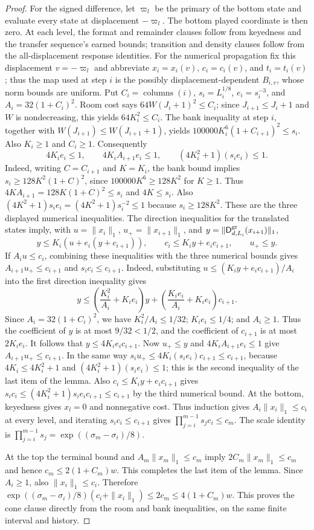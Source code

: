 \begin{proof}
For the signed difference, let $\varpi_l$ be the primary of the bottom state
and evaluate every state at displacement $-\varpi_l$. The bottom played
coordinate is then zero. At each level, the format and remainder clauses
follow from keyedness and the transfer sequence's earned bounds; transition and density
clauses follow from the all-displacement response identities. For the
numerical propagation fix this displacement $v=-\varpi_l$ and abbreviate
$x_i=x_i(v)$, $c_i=c_i(v)$, and $t_i=t_i(v)$; thus the map used at step $i$
is the possibly displacement-dependent $B_{i,v}$, whose norm bounds are
uniform. Put $C_i=\operatorname{columns}(i)$,
$s_i=L_i^{1/8}$, $e_i=s_i^{-3}$, and $A_i=32(1+C_i)^2$. Room cost says
$64W(J_i+1)^2\leq C_i$; since $J_{i+1}\leq J_i+1$ and $W$ is
nondecreasing, this yields $64K_i^2\leq C_i$. The bank inequality at
step $i$, together with $W(J_{i+1})\leq W(J_{i+1}+1)$, yields
$100000K_i^6(1+C_{i+1})^2\leq s_i$. Also $K_i\geq1$ and
$C_i\geq1$. Consequently
\[
 4K_ie_i\leq1,\qquad 4K_iA_{i+1}e_i\leq1,
       \qquad (4K_i^2+1)(s_ie_i)\leq1.
\]
Indeed, writing $C=C_{i+1}$ and $K=K_i$, the bank bound implies
$s_i\geq128K^2(1+C)^2$, since $100000K^6\geq128K^2$ for $K\geq1$.
Thus $4KA_{i+1}=128K(1+C)^2\leq s_i$ and $4K\leq s_i$.
Also $(4K^2+1)s_ie_i=(4K^2+1)s_i^{-2}\leq1$ because
$s_i\geq128K^2$. These are the three displayed numerical inequalities.
The direction inequalities for the translated states imply, with
$u=\|x_i\|_1$, $u_+=\|x_{i+1}\|_1$, and
$y=\|\mathsf D^{\rm gr}_{d,L_i}(x_{i+1})\|_1$,
\[
 y\leq K_i(u+e_i(y+c_{i+1})),\qquad
 c_i\leq K_i y+e_i c_{i+1},\qquad u_+\leq y.
\]
If $A_i u\leq c_i$, combining these inequalities with the three
numerical bounds gives
$A_{i+1}u_+\leq c_{i+1}$ and $s_i c_i\leq c_{i+1}$.
Indeed, substituting $u\leq(K_i y+e_i c_{i+1})/A_i$ into the first
direction inequality gives
\[
 y\leq \left(\frac{K_i^2}{A_i}+K_ie_i\right)y
       +\left(\frac{K_ie_i}{A_i}+K_ie_i\right)c_{i+1}.
\]
Since $A_i=32(1+C_i)^2$, we have $K_i^2/A_i\leq1/32$;
$K_ie_i\leq1/4$; and $A_i\geq1$. Thus the coefficient of $y$ is at
most $9/32<1/2$, and the coefficient of $c_{i+1}$ is at most
$2K_ie_i$. It follows that $y\leq4K_ie_i c_{i+1}$. Now $u_+\leq y$ and
$4K_iA_{i+1}e_i\leq1$ give $A_{i+1}u_+\leq c_{i+1}$. In the same way
$s_iu_+\leq4K_i(s_ie_i)c_{i+1}\leq c_{i+1}$, because
$4K_i\leq4K_i^2+1$ and $(4K_i^2+1)(s_ie_i)\leq1$; this is the second
inequality of the last item of the lemma. Also
$c_i\leq K_i y+e_i c_{i+1}$ gives
$s_ic_i\leq(4K_i^2+1)s_ie_i c_{i+1}\leq c_{i+1}$ by the third
numerical bound. At the bottom,
keyedness gives $x_l=0$ and nonnegative cost. Thus induction gives
$A_i\|x_i\|_1\leq c_i$ at every level, and iterating
$s_i c_i\leq c_{i+1}$ gives
$\prod_{j=i}^{m-1}s_j c_i\leq c_m$. The scale identity is
$\prod_{j=i}^{m-1}s_j=\exp((\sigma_m-\sigma_i)/8)$.

At the top the terminal bound and $A_m\|x_m\|_1\leq c_m$ imply
$2C_m\|x_m\|_1\leq c_m$ and hence
$c_m\leq2(1+C_m)w$. This completes the last item of the lemma.
Since $A_i\geq1$, also $\|x_i\|_1\leq c_i$. Therefore
$\exp((\sigma_m-\sigma_i)/8)(c_i+\|x_i\|_1)
\leq2c_m\leq4(1+C_m)w$. This proves the cone clause directly from
the room and bank inequalities, on the same finite interval and history.
\end{proof}


